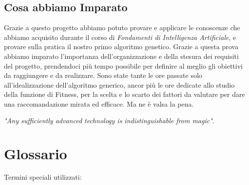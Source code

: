 \documentclass{article}
\begin{document}
\subsection{Cosa abbiamo Imparato}
Grazie a questo progetto abbiamo potuto provare e applicare le conoscenze che abbiamo acquisito durante il corso di \textit{Fondamenti di
Intelligenza Artificiale}, e provare sulla pratica il nostro primo algoritmo genetico. Grazie a questa prova abbiamo imparato l'importanza dell'organizzazione e della stesura dei requisiti del progetto, prendendoci più tempo possibile per definire al meglio gli obiettivi da raggiungere e da realizzare. Sono state tante le ore passate solo all'idealizzazione dell'algoritmo generico, ancor più le ore dedicate allo studio della funzione di Fitness, per la scelta e lo scarto dei fattori da valutare per dare una raccomandazione mirata ed efficace. Ma ne è valsa la pena.
\bigskip

\textit{"Any sufficiently advanced technology is indistinguishable from magic"}.
\pagebreak

\section{Glossario}



Termini speciali utilizzati:
\end{document}
